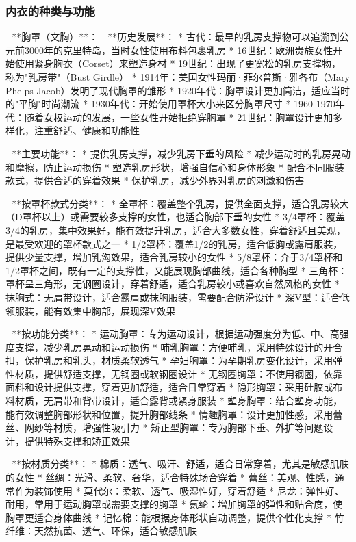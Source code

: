 \begin{enumerate}
\subsubsection{内衣的种类与功能}

- **胸罩（文胸）**：
  - **历史发展**：
    * 古代：最早的乳房支撑物可以追溯到公元前3000年的克里特岛，当时女性使用布料包裹乳房
    * 16世纪：欧洲贵族女性开始使用紧身胸衣（Corset）来塑造身材
    * 19世纪：出现了更宽松的乳房支撑物，称为"乳房带"（Bust Girdle）
    * 1914年：美国女性玛丽·菲尔普斯·雅各布（Mary Phelps Jacob）发明了现代胸罩的雏形
    * 1920年代：胸罩设计更加简洁，适应当时的"平胸"时尚潮流
    * 1930年代：开始使用罩杯大小来区分胸罩尺寸
    * 1960-1970年代：随着女权运动的发展，一些女性开始拒绝穿胸罩
    * 21世纪：胸罩设计更加多样化，注重舒适、健康和功能性

  - **主要功能**：
    * 提供乳房支撑，减少乳房下垂的风险
    * 减少运动时的乳房晃动和摩擦，防止运动损伤
    * 塑造乳房形状，增强自信心和身体形象
    * 配合不同服装款式，提供合适的穿着效果
    * 保护乳房，减少外界对乳房的刺激和伤害

  - **按罩杯款式分类**：
    * 全罩杯：覆盖整个乳房，提供全面支撑，适合乳房较大（D罩杯以上）或需要较多支撑的女性，也适合胸部下垂的女性
    * 3/4罩杯：覆盖3/4的乳房，集中效果好，能有效提升乳房，适合大多数女性，穿着舒适且美观，是最受欢迎的罩杯款式之一
    * 1/2罩杯：覆盖1/2的乳房，适合低胸或露肩服装，提供少量支撑，增加乳沟效果，适合乳房较小的女性
    * 5/8罩杯：介于3/4罩杯和1/2罩杯之间，既有一定的支撑性，又能展现胸部曲线，适合各种胸型
    * 三角杯：罩杯呈三角形，无钢圈设计，穿着舒适，适合乳房较小或喜欢自然风格的女性
    * 抹胸式：无肩带设计，适合露肩或抹胸服装，需要配合防滑设计
    * 深V型：适合低领服装，能有效集中胸部，展现深V效果

  - **按功能分类**：
    * 运动胸罩：专为运动设计，根据运动强度分为低、中、高强度支撑，减少乳房晃动和运动损伤
    * 哺乳胸罩：方便哺乳，采用特殊设计的开合扣，保护乳房和乳头，材质柔软透气
    * 孕妇胸罩：为孕期乳房变化设计，采用弹性材质，提供舒适支撑，无钢圈或软钢圈设计
    * 无钢圈胸罩：不使用钢圈，依靠面料和设计提供支撑，穿着更加舒适，适合日常穿着
    * 隐形胸罩：采用硅胶或布料材质，无肩带和背带设计，适合露背或紧身服装
    * 塑身胸罩：结合塑身功能，能有效调整胸部形状和位置，提升胸部线条
    * 情趣胸罩：设计更加性感，采用蕾丝、网纱等材质，增强性吸引力
    * 矫正型胸罩：专为胸部下垂、外扩等问题设计，提供特殊支撑和矫正效果

  - **按材质分类**：
    * 棉质：透气、吸汗、舒适，适合日常穿着，尤其是敏感肌肤的女性
    * 丝绸：光滑、柔软、奢华，适合特殊场合穿着
    * 蕾丝：美观、性感，通常作为装饰使用
    * 莫代尔：柔软、透气、吸湿性好，穿着舒适
    * 尼龙：弹性好、耐用，常用于运动胸罩或需要支撑的胸罩
    * 氨纶：增加胸罩的弹性和贴合度，使胸罩更适合身体曲线
    * 记忆棉：能根据身体形状自动调整，提供个性化支撑
    * 竹纤维：天然抗菌、透气、环保，适合敏感肌肤


\end{enumerate}
